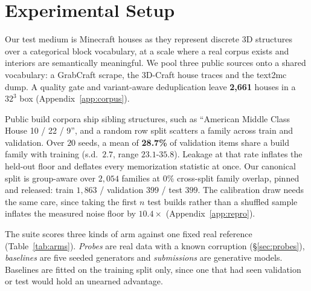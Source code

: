 \section{Experimental Setup}
\label{sec:setting}

Our test medium is Minecraft houses as they represent discrete {3D} structures over a categorical block
vocabulary, at a scale where a real corpus exists and interiors are semantically
meaningful. We pool three public sources onto a shared vocabulary: a GrabCraft scrape,
the 3D-Craft house traces \citep{chen2019voxelcnn,gray2019craftassist} and the text2mc
dump. A quality gate and variant-aware deduplication leave \textbf{2{,}661} houses in a
$32^3$ box (Appendix~\ref{app:corpus}).

Public build corpora ship sibling structures, such as ``American Middle Class House 10 /
22 / 9'', and a random row split scatters a family across train and validation. Over $20$
seeds, a mean of \textbf{28.7\%} of validation items share a build family with training
(s.d.\ $2.7$, range $23.1$-$35.8$). Leakage at that rate inflates the held-out floor and
deflates every memorization statistic at once. Our canonical split is group-aware over
$2{,}054$ families at $0\%$ cross-split family overlap, pinned and released: train
$1{,}863$ / validation $399$ / test $399$.  The calibration draw needs the same care, since
taking the first $n$ test builds rather than a shuffled sample inflates the measured noise
floor by $\mathbf{10.4\times}$ (Appendix~\ref{app:repro}).

The suite scores three kinds of arm against one fixed real reference
(Table~\ref{tab:arms}). \emph{Probes} are real data with a known corruption
(\S\ref{sec:probes}), \emph{baselines} are five seeded generators and
\emph{submissions} are generative models. Baselines are fitted on the training split
only, since one that had seen validation or test would hold an unearned advantage.

